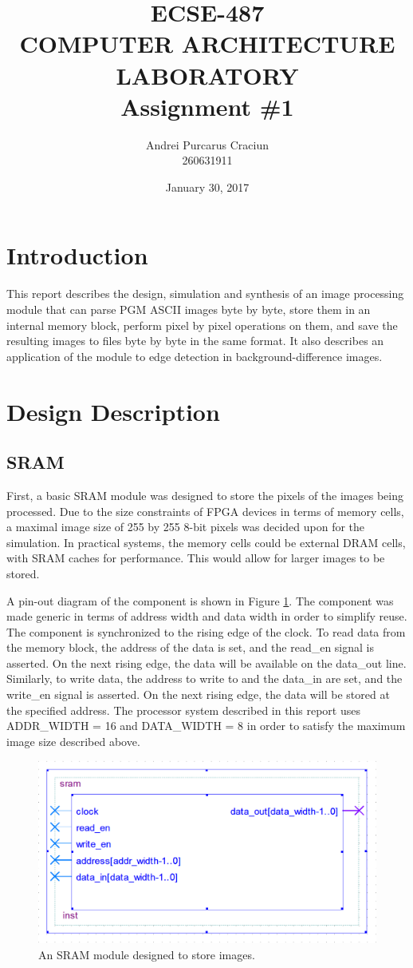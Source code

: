 \documentclass[a4paper, 10pt, titlepage]{article}
\title{\textbf{ECSE-487 \\ COMPUTER ARCHITECTURE LABORATORY \\ Assignment \#1}}
\author{Andrei Purcarus Craciun \\ 260631911}
\date{January 30, 2017}
\begin{document}
\maketitle

\section{Introduction}

This report describes the design, simulation and synthesis of an image processing module that can parse PGM ASCII images byte by byte, store them in an internal memory block, perform pixel by pixel operations on them, and save the resulting images to files byte by byte in the same format. It also describes an application of the module to edge detection in background-difference images.

\section{Design Description}

\subsection{SRAM}

First, a basic SRAM module was designed to store the pixels of the images being processed. Due to the size constraints of FPGA devices in terms of memory cells, a maximal image size of 255 by 255 8-bit pixels was decided upon for the simulation. In practical systems, the memory cells could be external DRAM cells, with SRAM caches for performance. This would allow for larger images to be stored.

A pin-out diagram of the component is shown in Figure \ref{fig:sram}. The component was made generic in terms of address width and data width in order to simplify reuse. The component is synchronized to the rising edge of the clock. To read data from the memory block, the address of the data is set, and the read\_en signal is asserted. On the next rising edge, the data will be available on the data\_out line. Similarly, to write data, the address to write to and the data\_in are set, and the write\_en signal is asserted. On the next rising edge, the data will be stored at the specified address. The processor system described in this report uses ADDR\_WIDTH = 16 and DATA\_WIDTH = 8 in order to satisfy the maximum image size described above.

\begin{figure}[htb]
    \centering
    \includegraphics[width=0.5\linewidth]{sram_entity.PNG}
    \caption{An SRAM module designed to store images.}
    \label{fig:sram}
\end{figure}
\end{document}
